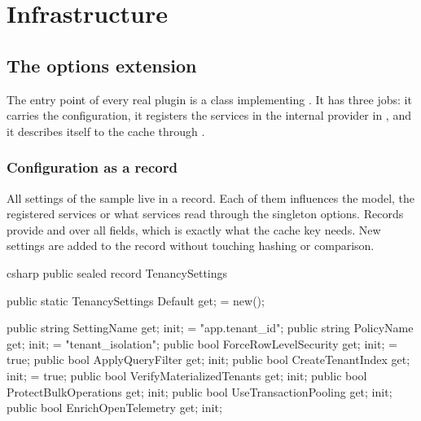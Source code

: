 \part{Infrastructure}\label{part:infrastructure}

\chapter{The options extension}\label{ch:the-options-extension}

The entry point of every real plugin is a class implementing
. It has three jobs:
it carries the configuration, it registers the services in the internal provider in
, and it describes itself to the cache through .

\section{Configuration as a record}

All settings of the sample live in a record. Each of them influences the model, the
registered services or what services read through the singleton options. Records provide 
and  over all fields, which is exactly what the
cache key needs. New settings are added to the record without touching hashing or
comparison.

\begin{sourcecode}{csharp}
public sealed record TenancySettings
{
    public static TenancySettings Default { get; } = new();

    public string SettingName { get; init; } = "app.tenant_id";
    public string PolicyName { get; init; } = "tenant_isolation";
    public bool ForceRowLevelSecurity { get; init; } = true;
    public bool ApplyQueryFilter { get; init; }
    public bool CreateTenantIndex { get; init; } = true;
    public bool VerifyMaterializedTenants { get; init; }
    public bool ProtectBulkOperations { get; init; }
    public bool UseTransactionPooling { get; init; }
    public bool EnrichOpenTelemetry { get; init; }
}
\end{sourcecode}

